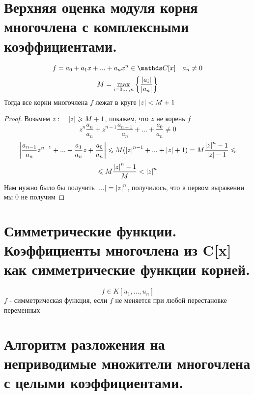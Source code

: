 \documentclass[algebra, 12pt, fleqn]{subfiles}
\begin{document}
\section{Верхняя оценка модуля корня многочлена с комплексными коэффициентами.}
	
  \begin{Theorem}
	\[f = a_0 + a_1 x + ... + a_n x^n \in \CC [x] \q a_n \neq 0\]
	\[M = \underset{i = 0, ..., n}{\max} \left\{\frac{\left|a_i\right|}{\left|a_n\right|}\right\}\]
	Тогда все корни многочлена $f$ лежат в круге $\left|z\right| < M + 1$
  \end{Theorem}

  \begin{proof}
      	Возьмем $z :  \quad \left|z\right| \geqslant M + 1$, покажем, что $z$  не корень $f$
		\[z^n \frac{a_n}{a_n} + z^{n - 1}  \frac{a_{n - 1} }{a_n} + ... + \frac{a_0}{a_n} \neq 0\]
		\[\left|\frac{a_{n - 1} }{a_n} z^{n - 1} + ... + \frac{a_1}{a_n} z  + \frac{a_0}{a_n}\right| \leqslant M(\left|z\right|^{n - 1} + ... + \left|z\right| + 1) 
		= M \frac{\left|z\right|^n - 1}{\left|z\right| - 1} \leqslant\]
		\[\leqslant M \frac{\left|z\right|^n - 1}{M} < \left|z\right|^n\]
		Нам нужно было бы получить $\left|...\right| = \left|z\right|^n$, получилось, что в первом выражении мы 0 не получим
  \end{proof}
  \section{Симметрические функции. Коэффициенты многочлена из C[x] как симметрические функции корней.}

	\begin{Definition}
		\[f \in K[u_1, ..., u_n]\]
		$f$ - симметрическая функция, если $f$ не меняется при любой перестановке переменных
	\end{Definition}	

  \section{Алгоритм разложения на неприводимые множители многочлена с целыми коэффициентами.}
\end{document}

